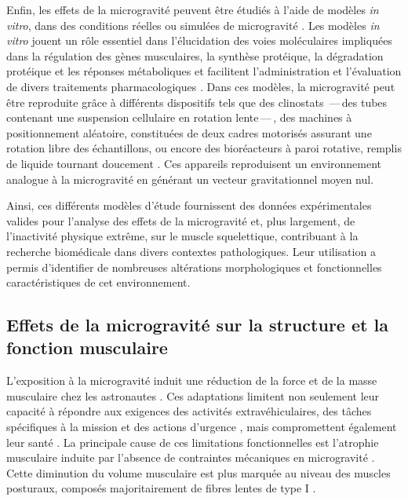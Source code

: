 \documentclass[11pt]{report}
\begin{document}
Enfin, les effets de la microgravité peuvent être étudiés à l'aide de modèles \textit{in vitro}, dans des conditions réelles ou simulées de microgravité \parencite{juhl_update_2021}. Les modèles \textit{in vitro} jouent un rôle essentiel dans l'élucidation des voies moléculaires impliquées dans la régulation des gènes musculaires, la synthèse protéique, la dégradation protéique et les réponses métaboliques \parencite{Cao2025Jun} et facilitent l'administration et l'évaluation de divers traitements pharmacologiques \parencite{Allen2022Dec}. Dans ces modèles, la microgravité peut être reproduite grâce à différents dispositifs tels que des clinostats \,---\,des tubes contenant une suspension cellulaire en rotation lente\,---\,, des machines à positionnement aléatoire, constituées de deux cadres motorisés assurant une rotation libre des échantillons, ou encore des bioréacteurs à paroi rotative, remplis de liquide tournant doucement \parencite{juhl_update_2021}. Ces appareils reproduisent un environnement analogue à la microgravité en générant un vecteur gravitationnel moyen nul.

\medskip Ainsi, ces différents modèles d'étude fournissent des données expérimentales valides pour l'analyse des effets de la microgravité et, plus largement, de l'inactivité physique extrême, sur le muscle squelettique, contribuant à la recherche biomédicale dans divers contextes pathologiques. Leur utilisation a permis d'identifier de nombreuses altérations morphologiques et fonctionnelles caractéristiques de cet environnement.

\subsection{Effets de la microgravité sur la structure et la fonction musculaire}
\label{subsec:adapt_morphofonc}

L'exposition à la microgravité induit une réduction de la force et de la masse musculaire chez les astronautes \parencite{Trappe2009Apr,adams_skeletal_2003}. Ces adaptations limitent non seulement leur capacité à répondre aux exigences des activités extravéhiculaires, des tâches spécifiques à la mission et des actions d'urgence \parencite{adams_skeletal_2003}, mais compromettent également leur santé \parencite{beaudart_health_2025}. La principale cause de ces limitations fonctionnelles est l'atrophie musculaire induite par l'absence de contraintes mécaniques en microgravité \parencite{bosutti_microgravity-induced_2025, williams_acclimation_2009}. Cette diminution du volume musculaire est plus marquée au niveau des muscles posturaux, composés majoritairement de fibres lentes de type I \parencite{hardy_time_2022,baldwin_alterations_2013}. 
\end{document}
